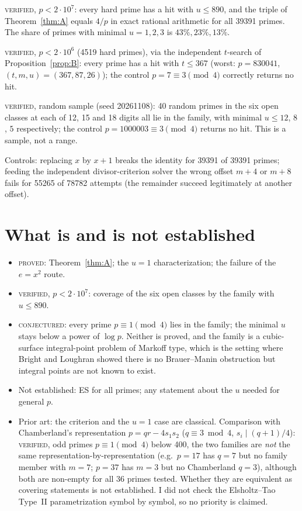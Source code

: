 \documentclass[11pt]{article}
\theoremstyle{remark}
\begin{document}
\noindent \textsc{verified}, $p<2\cdot10^7$: every hard prime has a hit with $u\le 890$, and the triple of Theorem~\ref{thm:A} equals $4/p$ in exact rational arithmetic for all 39391 primes. The share of primes with minimal $u=1,2,3$ is $43\%,23\%,13\%$.

\noindent \textsc{verified}, $p<2\cdot10^6$ (4519 hard primes), via the independent $t$-search of Proposition~\ref{prop:B}: every prime has a hit with $t\le 367$ (worst: $p=830041$, $(t,m,u)=(367,87,26)$); the control $p=7\equiv3\pmod 4$ correctly returns no hit.

\noindent \textsc{verified}, random sample (seed 20261108): 40 random primes in the six open classes at each of 12, 15 and 18 digits all lie in the family, with minimal $u\le 12$, $8$, $5$ respectively; the control $p=1000003\equiv3\pmod 4$ returns no hit. This is a sample, not a range.

\noindent Controls: replacing $x$ by $x+1$ breaks the identity for 39391 of 39391 primes; feeding the independent divisor-criterion solver the wrong offset $m+4$ or $m+8$ fails for 55265 of 78782 attempts (the remainder succeed legitimately at another offset).

\section{What is and is not established}

\begin{itemize}
\item \textsc{proved}: Theorem~\ref{thm:A}; the $u=1$ characterization; the failure of the $e=x^2$ route.
\item \textsc{verified}, $p<2\cdot10^7$: coverage of the six open classes by the family with $u\le 890$.
\item \textsc{conjectured}: every prime $p\equiv1\pmod 4$ lies in the family; the minimal $u$ stays below a power of $\log p$. Neither is proved, and the family is a cubic-surface integral-point problem of Markoff type, which is the setting where Bright and Loughran showed there is no Brauer--Manin obstruction but integral points are not known to exist.
\item Not established: ES for all primes; any statement about the $u$ needed for general $p$.
\item Prior art: the criterion and the $u=1$ case are classical. Comparison with Chamberland's representation $p=qr-4s_1s_2$ ($q\equiv3\bmod 4$, $s_i\mid (q+1)/4$): \textsc{verified}, odd primes $p\equiv1\pmod 4$ below 400, the two families are \emph{not} the same representation-by-representation (e.g.\ $p=17$ has $q=7$ but no family member with $m=7$; $p=37$ has $m=3$ but no Chamberland $q=3$), although both are non-empty for all 36 primes tested. Whether they are equivalent as covering statements is not established. I did not check the Elsholtz--Tao Type~II parametrization symbol by symbol, so no priority is claimed.
\end{itemize}
\end{document}
